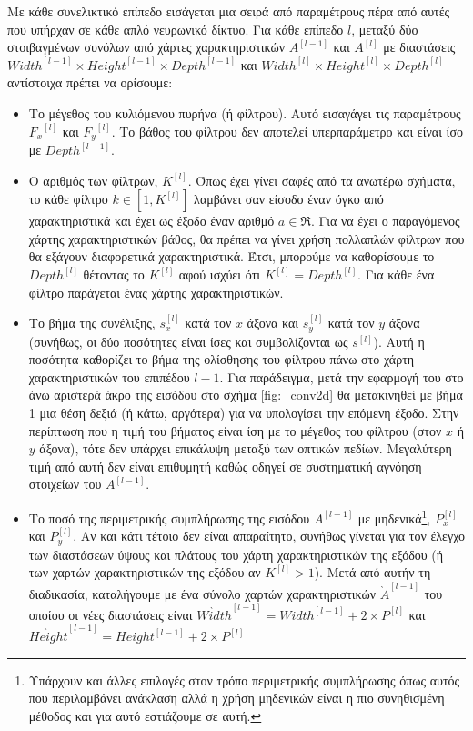 Με κάθε συνελικτικό επίπεδο εισάγεται μια σειρά από παραμέτρους πέρα από αυτές που υπήρχαν σε κάθε απλό νευρωνικό δίκτυο. Για κάθε επίπεδο $l$, μεταξύ δύο στοιβαγμένων συνόλων από χάρτες χαρακτηριστικών $A^{[l-1]}$ και $A^{[l]}$ με διαστάσεις ${Width}^{[l-1]} \times {Height}^{[l-1]}\times{Depth}^{[l-1]}$ και ${Width}^{[l]} \times {Height}^{[l]}\times{Depth}^{[l]}$ αντίστοιχα πρέπει να ορίσουμε:
\begin{itemize}
  \item Το μέγεθος του κυλιόμενου πυρήνα (ή φίλτρου). Αυτό εισαγάγει τις παραμέτρους ${F_x}^{[l]}$ και ${F_y}^{[l]}$. Το βάθος του φίλτρου δεν αποτελεί υπερπαράμετρο και είναι ίσο με ${Depth}^{[l-1]}$.
  \item Ο αριθμός των φίλτρων, $K^{[l]}$. Όπως έχει γίνει σαφές από τα ανωτέρω σχήματα, το κάθε φίλτρο $k \in [1,K^{[l]}]$ λαμβάνει σαν είσοδο έναν όγκο από χαρακτηριστικά και έχει ως έξοδο έναν αριθμό $a \in \Re$. Για να έχει ο παραγόμενος χάρτης χαρακτηριστικών βάθος, θα πρέπει να γίνει χρήση πολλαπλών φίλτρων που θα εξάγουν διαφορετικά χαρακτηριστικά. Έτσι, μπορούμε να καθορίσουμε το $ {Depth}^{[l]}$ θέτοντας το $K^{[l]}$ αφού ισχύει ότι $K^{[l]} = {Depth}^{[l]}$. Για κάθε ένα φίλτρο παράγεται ένας χάρτης χαρακτηριστικών.
  \item Το βήμα της συνέλιξης, $s^{[l]}_x$ κατά τον $x$ άξονα και $s^{[l]}_y$ κατά τον $y$ άξονα (συνήθως, οι δύο ποσότητες είναι ίσες και συμβολίζονται ως $s^{[l]}$). Αυτή η ποσότητα καθορίζει το βήμα της ολίσθησης του φίλτρου πάνω στο χάρτη χαρακτηριστικών του επιπέδου $l-1$. Για παράδειγμα, μετά την εφαρμογή του στο άνω αριστερά άκρο της εισόδου στο σχήμα \ref{fig:_conv2d} θα μετακινηθεί με βήμα 1 μια θέση δεξιά (ή κάτω, αργότερα) για να υπολογίσει την επόμενη έξοδο. Στην περίπτωση που η τιμή του βήματος είναι ίση με το μέγεθος του φίλτρου (στον $x$ ή $y$ άξονα), τότε δεν υπάρχει επικάλυψη μεταξύ των οπτικών πεδίων. Μεγαλύτερη τιμή από αυτή δεν είναι επιθυμητή καθώς οδηγεί σε συστηματική αγνόηση στοιχείων του $A^{[l-1]}$.
  \item Το ποσό της περιμετρικής συμπλήρωσης της εισόδου $A^{[l-1]}$ με μηδενικά\footnote{Υπάρχουν και άλλες επιλογές στον τρόπο περιμετρικής συμπλήρωσης όπως αυτός που περιλαμβάνει ανάκλαση αλλά η χρήση μηδενικών είναι η πιο συνηθισμένη μέθοδος και για αυτό εστιάζουμε σε αυτή.}, $P^{[l]}_x$ και $P^{[l]}_y$.  Αν και κάτι τέτοιο δεν είναι απαραίτητο, συνήθως γίνεται για τον έλεγχο των διαστάσεων ύψους και πλάτους του χάρτη χαρακτηριστικών της εξόδου (ή των χαρτών χαρακτηριστικών της εξόδου αν $K^{[l]} > 1$). Μετά από αυτήν τη διαδικασία, καταλήγουμε με ένα σύνολο χαρτών χαρακτηριστικών $\grave{A}^{[l-1]}$ του οποίου οι νέες διαστάσεις είναι $\grave{Width}^{[l-1]} = {Width}^{[l-1]} + 2\times P^{[l]}$ και $\grave{Height}^{[l-1]} = {Height}^{[l-1]} + 2\times P^{[l]}$
\end{itemize}
